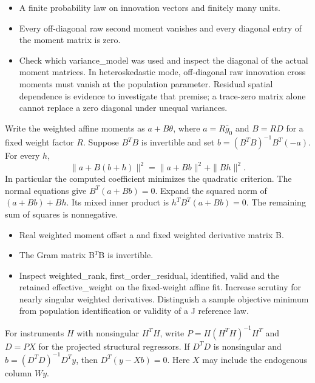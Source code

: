 \expandafter\def\csname statadic@assumptions@STATADIC-GMM-002\endcsname{\begin{itemize}
\item A finite probability law on innovation vectors and finitely many units.
\item Every off-diagonal raw second moment vanishes and every diagonal entry of the moment matrix is zero.
\end{itemize}}
\expandafter\def\csname statadic@diagnostics@STATADIC-GMM-002\endcsname{\begin{itemize}
\item Check which variance\_model was used and inspect the diagonal of the actual moment matrices. In heteroskedastic mode, off-diagonal raw innovation cross moments must vanish at the population parameter. Residual spatial dependence is evidence to investigate that premise; a trace-zero matrix alone cannot replace a zero diagonal under unequal variances.
\end{itemize}}
\expandafter\def\csname statadic@statement@STATADIC-GMM-003\endcsname{Write the weighted affine moments as $a+B\theta$,
  where $a=R\bar g_0$ and $B=R D$ for a fixed weight factor $R$.
  Suppose $B^TB$ is invertible and set
  $b=(B^TB)^{-1}B^T(-a)$. For every $h$,
  \[
    \|a+B(b+h)\|^2=\|a+Bb\|^2+\|Bh\|^2 .
  \]
  In particular the computed coefficient minimizes the quadratic criterion.}
\expandafter\def\csname statadic@proof@STATADIC-GMM-003\endcsname{The normal equations give $B^T(a+Bb)=0$. Expand
  the squared norm of $(a+Bb)+Bh$. Its mixed inner product is
  $h^TB^T(a+Bb)=0$. The remaining sum of squares is nonnegative.}
\expandafter\def\csname statadic@assumptions@STATADIC-GMM-003\endcsname{\begin{itemize}
\item Real weighted moment offset a and fixed weighted derivative matrix B.
\item The Gram matrix B\ensuremath{{}^T}B is invertible.
\end{itemize}}
\expandafter\def\csname statadic@diagnostics@STATADIC-GMM-003\endcsname{\begin{itemize}
\item Inspect weighted\_rank, first\_order\_residual, identified, valid and the retained effective\_weight on the fixed-weight affine fit. Increase scrutiny for nearly singular weighted derivatives. Distinguish a sample objective minimum from population identification or validity of a J reference law.
\end{itemize}}
\expandafter\def\csname statadic@statement@STATADIC-IV-001\endcsname{For instruments $H$ with nonsingular $H^TH$, write
  $P=H(H^TH)^{-1}H^T$ and $D=PX$ for the projected structural regressors.
  If $D^TD$ is nonsingular and $b=(D^TD)^{-1}D^Ty$, then
  $D^T(y-Xb)=0$. Here $X$ may include the endogenous column $Wy$.}
